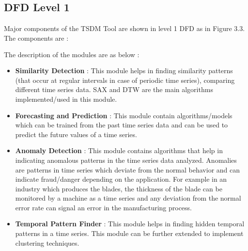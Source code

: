 \documentclass[12pt,a4paper]{report}
\begin{document}
\subsection{DFD Level 1}
\paragraph{}Major components of the TSDM Tool are shown in  level 1 DFD as in Figure 3.3. The components are :

\noindent
The description of the modules are as below :
\begin{itemize}
\item \textbf{Similarity Detection} : This module helps in finding similarity patterns (that occur at regular intervals in case of periodic time series), comparing different time series data. SAX and DTW are the main algorithms implemented/used in this module.
\item \textbf{Forecasting and Prediction} : This module contain algorithms/models which can be trained from the past time series data and can be used to predict the future values of a time series. 
\item \textbf{Anomaly Detection} : This module contains algorithms that help in indicating anomalous patterns in the time series data analyzed. Anomalies are patterns in time series which deviate from the normal behavior and can indicate fraud/danger depending on the application. For example in an industry which produces the blades, the thickness of the blade can be monitored by a machine as a time series and any deviation from the normal error rate can signal an error in the manufacturing process.
\item \textbf{Temporal Pattern Finder } : This module helps in finding hidden temporal patterns in a time series. This module can be further extended to implement clustering techniques.
\end{itemize}
\end{document}
